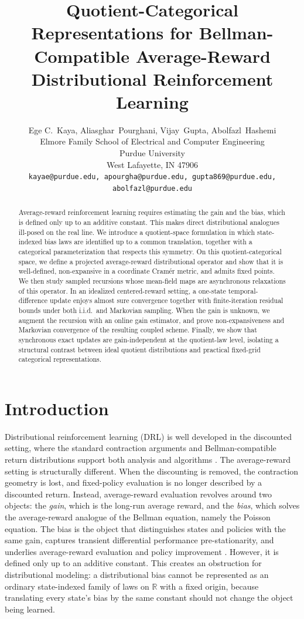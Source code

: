 \documentclass{article}
\title{Quotient-Categorical Representations for Bellman-Compatible Average-Reward Distributional Reinforcement Learning}
\author{Ege C.~Kaya, Aliasghar~Pourghani, Vijay~Gupta, Abolfazl~Hashemi  \\
  Elmore Family School of Electrical and Computer Engineering\\
  Purdue University\\
  West Lafayette, IN 47906 \\
  \texttt{kayae@purdue.edu, apourgha@purdue.edu, gupta869@purdue.edu, abolfazl@purdue.edu}}
\newcommand{\R}{\mathbb{R}}
\begin{document}
\maketitle

\begin{abstract}
Average-reward reinforcement learning requires estimating the gain and the bias, which is defined only up to an additive constant. This makes direct distributional analogues ill-posed on the real line. We introduce a quotient-space formulation in which state-indexed bias laws are identified up to a common translation, together with a categorical parameterization that respects this symmetry. On this quotient-categorical space, we define a projected average-reward distributional operator and show that it is well-defined, non-expansive in a coordinate Cram\'er metric, and admits fixed points. We then study sampled recursions whose mean-field maps are asynchronous relaxations of this operator. In an idealized centered-reward setting, a one-state temporal-difference update enjoys almost sure convergence together with finite-iteration residual bounds under both i.i.d.\ and Markovian sampling. When the gain is unknown, we augment the recursion with an online gain estimator, and prove non-expansiveness and Markovian convergence of the resulting coupled scheme. Finally, we show that synchronous exact updates are gain-independent at the quotient-law level, isolating a structural contrast between ideal quotient distributions and practical fixed-grid categorical representations.
\end{abstract}

\section{Introduction}

Distributional reinforcement learning (DRL) is well developed in the discounted setting, where the standard contraction arguments and Bellman-compatible return distributions support both analysis and algorithms \citep{bellemare2017distributional, bellemare2023distributional, rowland2018analysis, dabney2018distributional, dabney2018implicit}. The average-reward setting is structurally different. When the discounting is removed, the contraction geometry is lost, and fixed-policy evaluation is no longer described by a discounted return. Instead, average-reward evaluation revolves around two objects: the \emph{gain}, which is the long-run average reward, and the \emph{bias}, which solves the average-reward analogue of the Bellman equation, namely the Poisson equation. The bias is the object that distinguishes states and policies with the same gain, captures transient differential performance pre-stationarity, and underlies average-reward evaluation and policy improvement \citep{puterman, sutton1998reinforcement, mahadevan1996average}. However, it is defined only up to an additive constant. This creates an obstruction for distributional modeling: a distributional bias cannot be represented as an ordinary state-indexed family of laws on $\R$ with a fixed origin, because translating every state's bias by the same constant should not change the object being learned.
\end{document}
